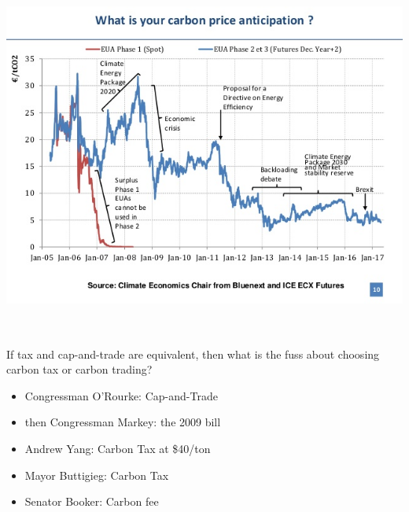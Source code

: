 \begin{frame}{}
\protect\hypertarget{section-18}{}

\includegraphics[width=\textwidth,height=4.6875in]{figures/m4_euets_prices.jpg}

\end{frame}

\begin{frame}{}
\protect\hypertarget{section-19}{}

If tax and cap-and-trade are equivalent, then what is the fuss about
choosing carbon tax or carbon trading?

\end{frame}

\begin{frame}{}
\protect\hypertarget{section-20}{}

\begin{itemize}
\item
  Congressman O'Rourke: Cap-and-Trade
\item
  then Congressman Markey: the 2009 bill
\item
  Andrew Yang: Carbon Tax at \$40/ton
\item
  Mayor Buttigieg: Carbon Tax
\item
  Senator Booker: Carbon fee
\end{itemize}

\end{frame}

